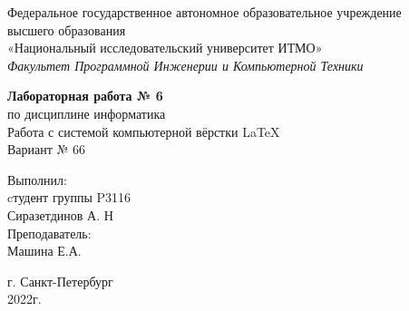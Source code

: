 \thispagestyle{empty} %
\begin{center}
	Федеральное государственное автономное образовательное учреждение\\ 
	высшего образования\\
	«Национальный исследовательский университет ИТМО»\\
	\textit{Факультет Программной Инженерии и Компьютерной Техники}\\
\end{center}
\vspace{2cm}
\begin{center}
	\large
	\textbf{Лабораторная работа № 6}\\
	по дисциплине информатика\\
	Работа с системой компьютерной вёрстки \LaTeX \\
	Вариант № 66
\end{center}
\vspace{7cm}
\begin{flushright}
	Выполнил:\\
	cтудент  группы P3116\\
	Сиразетдинов А. Н\\
	Преподаватель: \\
	Машина Е.А.\\
\end{flushright}
\vspace{6cm}
\begin{center}
	г. Санкт-Петербург\\
	2022г.
\end{center}